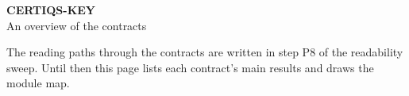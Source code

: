 \begin{center}
{\LARGE\bfseries CERTIQS-KEY}\\[4pt]
{\large An overview of the contracts}
\end{center}

\noindent The reading paths through the contracts are written in step P8 of
the readability sweep. Until then this page lists each contract's main results
and draws the module map.



